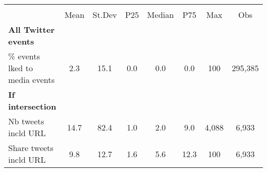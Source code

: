 {
\def\sym#1{\ifmmode^{#1}\else\(^{#1}\)\fi}
\begin{tabular}{l*{1}{ccccccc}}
\hline\hline
                    &\multicolumn{7}{c}{}                                                                      \\
                    &        Mean&      St.Dev&         P25&      Median&         P75&         Max&         Obs\\
\hline
\textbf{All Twitter events}&            &            &            &            &            &            &            \\
\% events lked to media events&         2.3&        15.1&         0.0&         0.0&         0.0&         100&     295,385\\
\textbf{If intersection}&            &            &            &            &            &            &            \\
Nb tweets incld URL &        14.7&        82.4&         1.0&         2.0&         9.0&       4,088&       6,933\\
Share tweets incld URL&         9.8&        12.7&         1.6&         5.6&        12.3&         100&       6,933\\
\hline\hline
\end{tabular}
}

